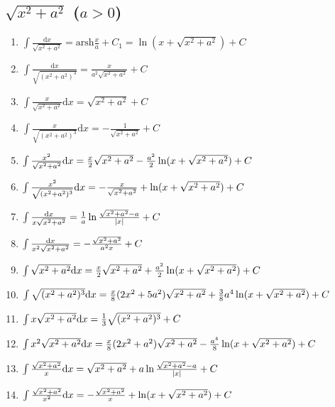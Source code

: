 	\subsection{$\sqrt{x^2+a^2}$ ($a>0$)}

	\begin{enumerate}

	\item $ \int \frac{\mathrm{d}x}{\sqrt{x^2+a^2}} = \mathrm{arsh} \frac{x}{a} + C_1 = \ln(x + \sqrt{x^2+a^2}) + C$

	\item $ \int \frac{\mathrm{d}x}{\sqrt{(x^2+a^2)^3}} = \frac{x}{a^2\sqrt{x^2+a^2}} + C $

	\item $ \int \frac{x}{\sqrt{x^2+a^2}} \mathrm{d}x = \sqrt{x^2+a^2} + C $

	\item $ \int \frac{x}{\sqrt{(x^2+a^2)^3}} \mathrm{d}x = -\frac{1}{\sqrt{x^2+a^2}} + C $

	\item $ \int \frac{x^2}{\sqrt{x^2+a^2}} \mathrm{d} x = \frac{x}{2}\sqrt{x^2+a^2} - \frac{a^2}{2}\ln(x+\sqrt{x^2+a^2}) + C $

	\item $ \int \frac{x^2}{\sqrt{(x^2+a^2)^3}} \mathrm{d} x = -\frac{x}{\sqrt{x^2+a^2}} + \ln(x+\sqrt{x^2+a^2}) + C $

	\item $ \int \frac{\mathrm{d} x}{x\sqrt{x^2+a^2}} = \frac{1}{a} \ln \frac{\sqrt{x^2+a^2}-a}{|x|} + C $

	\item $ \int \frac{\mathrm{d} x}{x^2\sqrt{x^2+a^2}} = -\frac{\sqrt{x^2+a^2}}{a^2x} + C $

	\item $ \int \sqrt{x^2+a^2} \mathrm{d} x = \frac{x}{2}\sqrt{x^2+a^2}+\frac{a^2}{2}\ln(x + \sqrt{x^2+a^2}) + C $

	\item $ \int \sqrt{(x^2+a^2)^3} \mathrm{d} x = \frac{x}{8}(2x^2+5a^2)\sqrt{x^2+a^2} + \frac{3}{8}a^4\ln(x + \sqrt{x^2+a^2}) + C $

	\item $ \int x \sqrt{x^2+a^2} \mathrm{d} x = \frac{1}{3} \sqrt{(x^2+a^2)^3} + C $

	\item $ \int x^2\sqrt{x^2+a^2} \mathrm{d} x = \frac{x}{8}(2x^2+a^2)\sqrt{x^2+a^2} - \frac{a^4}{8}\ln(x+\sqrt{x^2+a^2}) + C $

	\item $ \int \frac{\sqrt{x^2+a^2}}{x} \mathrm{d} x = \sqrt{x^2+a^2} + a \ln \frac{\sqrt{x^2+a^2}-a}{|x|} + C $

	\item $ \int \frac{\sqrt{x^2+a^2}}{x^2} \mathrm{d} x = -\frac{\sqrt{x^2+a^2}}{x} + \ln(x + \sqrt{x^2+a^2}) + C $

	\end{enumerate}

